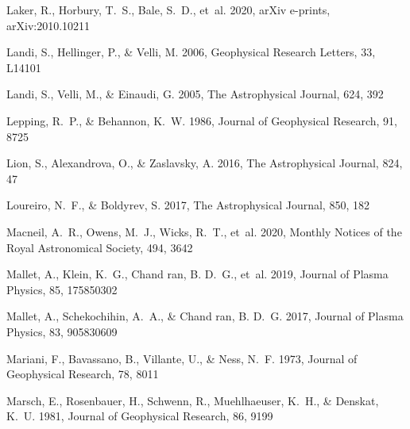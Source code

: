 \documentclass[]{aastex62}
\begin{document}
\begin{thebibliography}{}
{Laker}, R., {Horbury}, T.~S., {Bale}, S.~D., {et~al.} 2020, arXiv e-prints,
  arXiv:2010.10211

{Landi}, S., {Hellinger}, P., \& {Velli}, M. 2006, Geophysical Research
  Letters, 33, L14101

{Landi}, S., {Velli}, M., \& {Einaudi}, G. 2005, The Astrophysical Journal,
  624, 392

{Lepping}, R.~P., \& {Behannon}, K.~W. 1986, Journal of Geophysical Research,
  91, 8725

{Lion}, S., {Alexandrova}, O., \& {Zaslavsky}, A. 2016, The Astrophysical
  Journal, 824, 47

{Loureiro}, N.~F., \& {Boldyrev}, S. 2017, The Astrophysical Journal, 850, 182

{Macneil}, A.~R., {Owens}, M.~J., {Wicks}, R.~T., {et~al.} 2020, Monthly
  Notices of the Royal Astronomical Society, 494, 3642

{Mallet}, A., {Klein}, K.~G., {Chand ran}, B. D.~G., {et~al.} 2019, Journal of
  Plasma Physics, 85, 175850302

{Mallet}, A., {Schekochihin}, A.~A., \& {Chand ran}, B. D.~G. 2017, Journal of
  Plasma Physics, 83, 905830609

{Mariani}, F., {Bavassano}, B., {Villante}, U., \& {Ness}, N.~F. 1973, Journal
  of Geophysical Research, 78, 8011

{Marsch}, E., {Rosenbauer}, H., {Schwenn}, R., {Muehlhaeuser}, K.~H., \&
  {Denskat}, K.~U. 1981, Journal of Geophysical Research, 86, 9199


\end{thebibliography}
\end{document}
